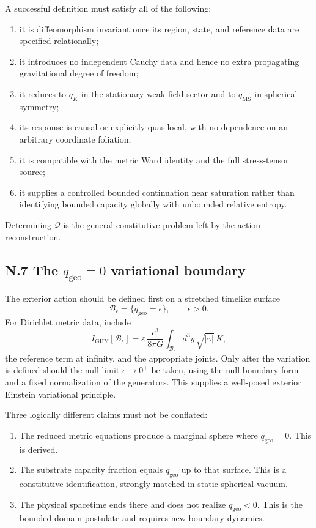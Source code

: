 \documentclass[11pt]{article}
\begin{document}
A successful definition must satisfy all of the following:
\begin{enumerate}
\item it is diffeomorphism invariant once its region, state, and reference data are specified relationally;
\item it introduces no independent Cauchy data and hence no extra propagating gravitational degree of freedom;
\item it reduces to $q_K$ in the stationary weak-field sector and to $q_{\mathrm{MS}}$ in spherical symmetry;
\item its response is causal or explicitly quasilocal, with no dependence on an arbitrary coordinate foliation;
\item it is compatible with the metric Ward identity and the full stress-tensor source;
\item it supplies a controlled bounded continuation near saturation rather than identifying bounded capacity globally with unbounded relative entropy.
\end{enumerate}
Determining $\mathcal Q$ is the general constitutive problem left by the action reconstruction.

\subsection*{N.7 The $q_{\mathrm{geo}}=0$ variational boundary}

The exterior action should be defined first on a stretched timelike surface
\[
\mathcal B_\epsilon=\{q_{\mathrm{geo}}=\epsilon\},
\qquad \epsilon>0.
\]
For Dirichlet metric data, include
\[
I_{\mathrm{GHY}}[\mathcal B_\epsilon]
=\varepsilon\,\frac{c^3}{8\pi G}
\int_{\mathcal B_\epsilon}d^3y\,\sqrt{|\gamma|}\,K,
\]
the reference term at infinity, and the appropriate joints. Only after the variation is defined should the null limit $\epsilon\to0^+$ be taken, using the null-boundary form and a fixed normalization of the generators. This supplies a well-posed exterior Einstein variational principle.

Three logically different claims must not be conflated:
\begin{enumerate}
\item The reduced metric equations produce a marginal sphere where $q_{\mathrm{geo}}=0$. This is derived.
\item The substrate capacity fraction equals $q_{\mathrm{geo}}$ up to that surface. This is a constitutive identification, strongly matched in static spherical vacuum.
\item The physical spacetime ends there and does not realize $q_{\mathrm{geo}}<0$. This is the bounded-domain postulate and requires new boundary dynamics.
\end{enumerate}
\end{document}
